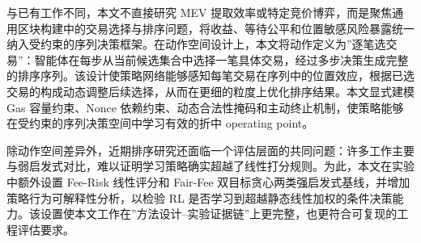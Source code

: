 与已有工作不同，本文不直接研究 MEV 提取效率或特定竞价博弈，而是聚焦通用区块构建中的交易选择与排序问题，将收益、等待公平和位置敏感风险暴露统一纳入受约束的序列决策框架。在动作空间设计上，本文将动作定义为”逐笔选交易”：智能体在每步从当前候选集合中选择一笔具体交易，经过多步决策生成完整的排序序列。该设计使策略网络能够感知每笔交易在序列中的位置效应，根据已选交易的构成动态调整后续选择，从而在更细的粒度上优化排序结果。本文显式建模 Gas 容量约束、Nonce 依赖约束、动态合法性掩码和主动终止机制，使策略能够在受约束的序列决策空间中学习有效的折中 operating point。

除动作空间差异外，近期排序研究还面临一个评估层面的共同问题：许多工作主要与弱启发式对比，难以证明学习策略确实超越了线性打分规则。为此，本文在实验中额外设置 Fee-Risk 线性评分和 Fair-Fee 双目标贪心两类强启发式基线，并增加策略行为可解释性分析，以检验 RL 是否学习到超越静态线性加权的条件决策能力。该设置使本文工作在”方法设计--实验证据链”上更完整，也更符合可复现的工程评估要求。
